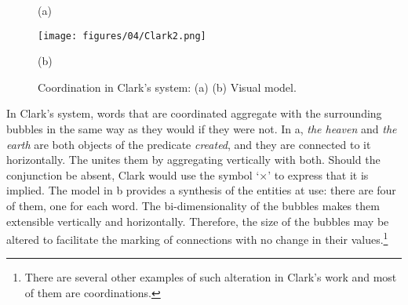 \documentclass[english,output=paper,colorlinks,citecolor=brown]{../langscibook}
\begin{document}
\begin{figure}
    (a) \hspace{1em} \begin{minipage}[c]{.45\textwidth}\texttt{[image: figures/04/Clark2.png]}\end{minipage}\hfill
    (b) \hspace{1em} 
    \caption{Coordination in Clark’s system: (a) \citet[24]{Clark1847} (b) Visual model.\label{fig:4:7}}    
\end{figure}
 



In Clark’s system, words that are coordinated aggregate with the surrounding bubbles in the same way as they would if they were not. In a, \textit{the heaven} and \textit{the earth} are both objects of the predicate \textit{created}, and they are connected to it horizontally. The  unites them by aggregating vertically with both. Should the conjunction be absent, Clark would use the symbol ‘×’ to express that it is implied. The model in b provides a synthesis of the entities at use: there are four of them, one for each word. The bi-dimensionality of the bubbles makes them extensible vertically and horizontally. Therefore, the size of the bubbles may be altered to facilitate the marking of connections with no change in their values.\footnote{\textrm{\textsuperscript{} }\textrm{There are several other examples of such alteration in Clark’s work and most of them are coordinations.} } 
\end{document}
